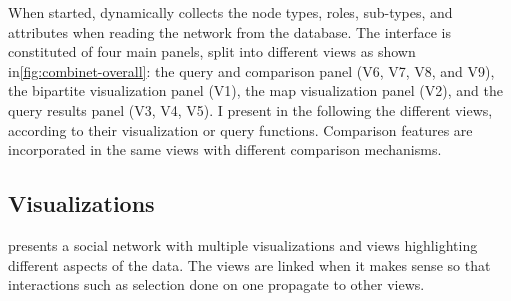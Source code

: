 \begin{table}[]
\centering
{}
    \caption{Comparison of the data model of several VA systems aimed at exploring bipartite social networks.
    }\label{tab:combinet-VA-comparison}
\end{table}


When started, \name dynamically collects the node types, roles, sub-types, and attributes when reading the network from the database. The interface is constituted of four main panels, split into different views as shown in\autoref{fig:combinet-overall}: the query and comparison panel (V6, V7, V8, and V9), the bipartite visualization panel (V1), the map visualization panel (V2), and the query results panel (V3, V4, V5).
I present in the following the different views, according to their visualization or query functions.
Comparison features are incorporated in the same views with different comparison mechanisms.


\subsection{Visualizations}

\name presents a social network with multiple visualizations and views highlighting different aspects of the data.
The views are linked when it makes sense so that interactions such as selection done on one propagate to other views.

